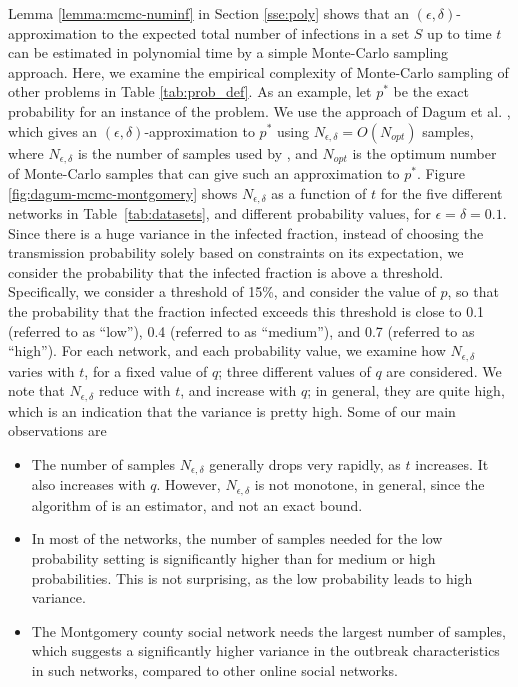 Lemma \ref{lemma:mcmc-numinf} in Section \ref{sse:poly} shows that an 
$(\epsilon, \delta)$-approximation to the expected total number of infections 
in a set $S$ up to time $t$ can be estimated in polynomial time by a simple
Monte-Carlo sampling approach. Here, we examine the empirical complexity
of Monte-Carlo sampling of other problems in Table \ref{tab:prob_def}.
As an example, let $p^*$ be the exact probability for an instance of the \tTotInfs{} problem.
We use the approach of Dagum et al. \cite{dagum:focs95}, which gives an
$(\epsilon, \delta)$-approximation to $p^*$ using 
$N_{\epsilon, \delta} = O(N_{opt})$ samples, where
$N_{\epsilon, \delta}$ is the number of samples used by \cite{dagum:focs95}, and
$N_{opt}$ is the optimum number of Monte-Carlo samples that can give such an approximation
to $p^*$.  Figure \ref{fig:dagum-mcmc-montgomery}
shows $N_{\epsilon, \delta}$ as a function
of $t$ for the five different networks in Table~\ref{tab:datasets}, 
and different probability values, for 
$\epsilon = \delta=0.1$.
Since there is a huge variance in the infected fraction, instead of
choosing the transmission probability solely based on constraints on its expectation,
we consider the probability that the infected fraction is above a threshold.
Specifically, we consider a threshold of 15\%, and consider the value of $p$, so that
the probability that the fraction infected exceeds this threshold is close to 0.1
(referred to as ``low''), 0.4 (referred to as ``medium''), and 0.7 (referred to as ``high'').
For each network, and each probability value, we examine how $N_{\epsilon, \delta}$
varies with $t$, for a fixed value of $q$; three different values of $q$ are considered.
We note that $N_{\epsilon, \delta}$ reduce with $t$, and increase with $q$;
in general, they are quite high, which is an indication that the variance is pretty high.
Some of our main observations are
\begin{itemize}
\item
The number of samples $N_{\epsilon, \delta}$ generally drops very rapidly, as $t$
increases. It also increases with $q$. However, $N_{\epsilon, \delta}$ is not monotone,
in general, since the algorithm of \cite{dagum:focs95} is an estimator, and not an exact bound.
\item
In most of the networks, the number of samples needed for the low probability
setting is significantly higher than for medium or high probabilities. This is not
surprising, as the low probability leads to high variance.
\item
The Montgomery county social network needs the largest number of samples,
which suggests a significantly higher variance in the outbreak characteristics
in such networks, compared to other online social networks.
\end{itemize}

